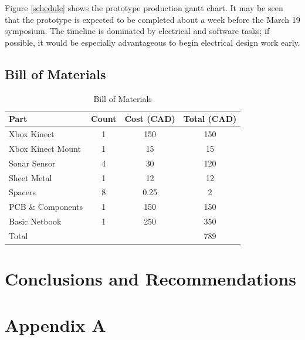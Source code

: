 \documentclass[oneside,final]{report}
\begin{document}
Figure \ref{schedule} shows the prototype production gantt chart.  It may be seen that the prototype is expected to be completed about a week before the March 19 symposium.  The timeline is dominated by electrical and software tasks; if possible, it would be especially advantageous to begin electrical design work early.

\section{Bill of Materials}
\begin{table}[t]
\centering
\begin{tabular}{|l|c|c|c|}
\hline
Part & Count & Cost (CAD) & Total (CAD) \\
\hline
Xbox Kinect & 1 & 150 & 150 \\
\hline
Xbox Kinect Mount & 1& 15 & 15 \\
Sonar Sensor & 4 & 30 & 120 \\
\hline
Sheet Metal & 1 & 12 & 12 \\
\hline
Spacers & 8 & 0.25 & 2 \\
\hline
PCB \& Components & 1 & 150 & 150 \\
\hline
Basic Netbook & 1 & 250 & 350 \\
\hline
\hline
Total&&&789\\
\hline
\end{tabular}
\caption{Bill of Materials}
\label{tab:BOM}
\end{table}


\chapter{Conclusions and Recommendations}

\chapter*{Appendix A}
\end{document}
